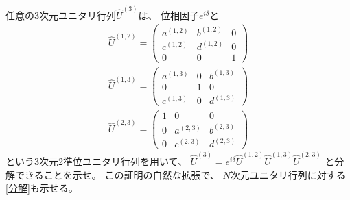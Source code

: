 \documentclass[a4paper, 10pt]{jsarticle}
\begin{document}
\begin{problem}
	任意の3次元ユニタリ行列$\hat{U}^{(3)}$は、
	位相因子$e^{i\delta}$と
	\begin{gather}
		\hat{U}^{(1,2)}
		= \left( \begin{array}{ccc}
			a^{(1,2)} & b^{(1,2)} & 0 \\
			c^{(1,2)} & d^{(1,2)} & 0 \\
			0 & 0 & 1
		\end{array} \right) \\
		\hat{U}^{(1,3)}
		= \left( \begin{array}{ccc}
			a^{(1,3)} & 0 & b^{(1,3)} \\
			0 & 1 & 0 \\
			c^{(1,3)} & 0 & d^{(1,3)}
		\end{array} \right) \\
		\hat{U}^{(2,3)}
		= \left( \begin{array}{ccc}
			1 & 0 & 0 \\
			0 & a^{(2,3)} & b^{(2,3)} \\
			0 & c^{(2,3)} & d^{(2,3)}
		\end{array} \right)
	\end{gather}
	という3次元2準位ユニタリ行列を用いて、
	$\hat{U}^{(3)}
	= e^{i\delta} \hat{U}^{(1,2)} \hat{U}^{(1,3)} \hat{U}^{(2,3)}$
	と分解できることを示せ。
	この証明の自然な拡張で、
	$N$次元ユニタリ行列に対する\eqref{分解}も示せる。

	\tcblower


\end{problem}
\end{document}
